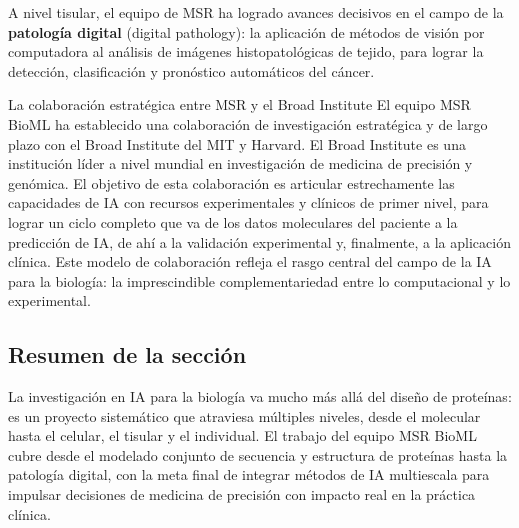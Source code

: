 A nivel tisular, el equipo de MSR ha logrado avances decisivos en el campo de la \textbf{patología digital} (digital pathology): la aplicación de métodos de visión por computadora al análisis de imágenes histopatológicas de tejido, para lograr la detección, clasificación y pronóstico automáticos del cáncer.

\begin{knowledgebox}{La colaboración estratégica entre MSR y el Broad Institute}
El equipo MSR BioML ha establecido una colaboración de investigación estratégica y de largo plazo con el Broad Institute del MIT y Harvard. El Broad Institute es una institución líder a nivel mundial en investigación de medicina de precisión y genómica. El objetivo de esta colaboración es articular estrechamente las capacidades de IA con recursos experimentales y clínicos de primer nivel, para lograr un ciclo completo que va de los datos moleculares del paciente a la predicción de IA, de ahí a la validación experimental y, finalmente, a la aplicación clínica. Este modelo de colaboración refleja el rasgo central del campo de la IA para la biología: la imprescindible complementariedad entre lo computacional y lo experimental.
\end{knowledgebox}

\subsection{Resumen de la sección}

La investigación en IA para la biología va mucho más allá del diseño de proteínas: es un proyecto sistemático que atraviesa múltiples niveles, desde el molecular hasta el celular, el tisular y el individual. El trabajo del equipo MSR BioML cubre desde el modelado conjunto de secuencia y estructura de proteínas hasta la patología digital, con la meta final de integrar métodos de IA multiescala para impulsar decisiones de medicina de precisión con impacto real en la práctica clínica.
